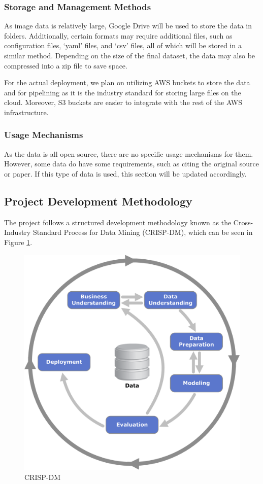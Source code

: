 \documentclass[stu,12pt,floatsintext]{apa7}
\begin{document}
\subsubsection{Storage and Management Methods}
As image data is relatively large, Google Drive will be used to store the data in folders. Additionally, certain formats may require additional files, such as configuration files, `yaml' files, and `csv' files, all of which will be stored in a similar method. Depending on the size of the final dataset, the data may also be compressed into a zip file to save space.

For the actual deployment, we plan on utilizing AWS buckets to store the data and for pipelining as it is the industry standard for storing large files on the cloud. Moreover, S3 buckets are easier to integrate with the rest of the AWS infrastructure.

\subsubsection{Usage Mechanisms}
As the data is all open-source, there are no specific usage mechanisms for them. However, some data do have some requirements, such as citing the original source or paper. If this type of data is used, this section will be updated accordingly.


\subsection{Project Development Methodology}
The project follows a structured development methodology known as the Cross-Industry Standard Process for Data Mining (CRISP-DM), which can be seen in Figure \ref{fig:crispdm}.

\begin{figure}[!htb]
	\centering
	\includegraphics[width=0.5\linewidth]{./images/CRISP-DM.png}
	\caption{CRISP-DM}
	\label{fig:crispdm}
\end{figure}
\end{document}
